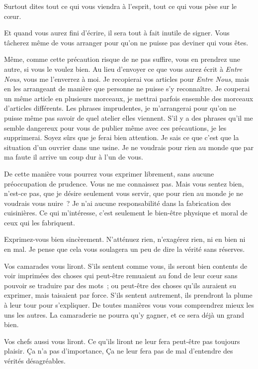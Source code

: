 \documentclass[french,twoside]{book} %
\begin{document}
Surtout dites tout ce qui vous viendra à l'esprit, tout ce qui vous pèse sur le cœur.\par
Et quand vous aurez fini d'écrire, il sera tout à fait inutile de signer. Vous tâcherez même de vous arranger pour qu'on ne puisse pas deviner qui vous êtes.\par
Même, comme cette précaution risque de ne pas suffire, vous en prendrez une autre, si vous le voulez bien. Au lieu d'envoyer ce que vous aurez écrit à {\itshape Entre Nous}, vous me l'enverrez à moi. Je recopierai vos articles pour {\itshape Entre Nous}, mais en les arrangeant de manière que personne ne puisse s'y reconnaître. Je couperai un même article en plusieurs morceaux, je mettrai parfois ensemble des morceaux d'articles différents. Les phrases imprudentes, je m'arrangerai pour qu'on ne puisse même pas savoir de quel atelier elles viennent. S'il y a des phrases qu'il me semble dangereux pour vous de publier même avec ces précautions, je les supprimerai. Soyez sûrs que je ferai bien attention. Je sais ce que c'est que la situation d'un ouvrier dans une usine. Je ne voudrais pour rien au monde que par ma faute il arrive un coup dur à l'un de vous.\par
De cette manière vous pourrez vous exprimer librement, sans aucune préoccupation de prudence. Vous ne me connaissez pas. Mais vous sentez bien, n'est-ce pas, que je désire seulement vous servir, que pour rien au monde je ne voudrais vous nuire ? Je n'ai aucune responsabilité dans la fabrication des cuisinières. Ce qui m'intéresse, c'est seulement le bien-être physique et moral de ceux qui les fabriquent.\par
Exprimez-vous bien sincèrement. N'atténuez rien, n'exagérez rien, ni en bien ni en mal. Je pense que cela vous soulagera un peu de dire la vérité sans réserves.\par
Vos camarades vous liront. S'ils sentent comme vous, ils seront bien contents de voir imprimées des choses qui peut-être remuaient au fond de leur cœur sans pouvoir se traduire par des mots ; ou peut-être des choses qu'ils auraient su exprimer, mais taisaient par force. S'ils sentent autrement, ils prendront la plume à leur tour pour s'expliquer. De toutes manières vous vous comprendrez mieux les uns les autres. La camaraderie ne pourra qu'y gagner, et ce sera déjà un grand bien.\par
Vos chefs aussi vous liront. Ce qu'ils liront ne leur fera peut-être pas toujours plaisir. Ça n'a pas d'importance, Ça ne leur fera pas de mal d'entendre des vérités désagréables.\par
\end{document}
